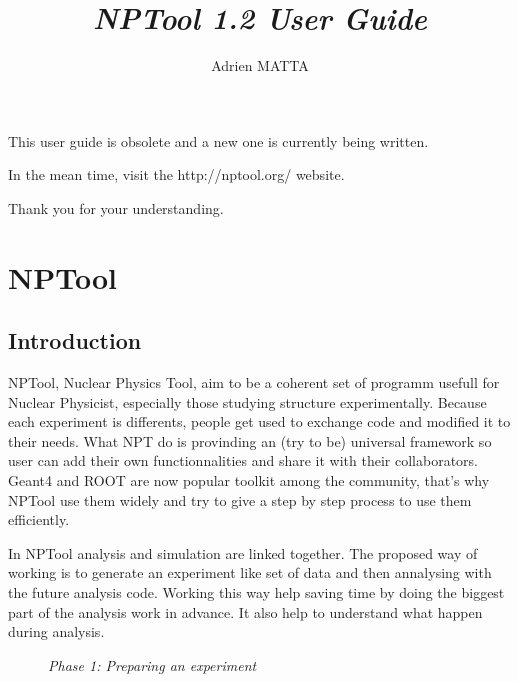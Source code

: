 \documentclass{book}
\begin{document}
\title{\emph{NPTool 1.2 User Guide}}
\author{Adrien MATTA}
\maketitle 

\clearpage
\vspace*{\fill}
\begin{center}
\begin{minipage}{.6\textwidth}
\large This user guide is obsolete and a new one is currently being written.

\large In the mean time, visit the http://nptool.org/ website. 

\large Thank you for your understanding.
\end{minipage}
\end{center}
\vfill %
\clearpage


\pagebreak
\tableofcontents %
\pagebreak

\chapter[NPTool]{NPTool}
\section {Introduction}

NPTool, Nuclear Physics Tool, aim to be a coherent set of programm usefull for Nuclear Physicist, especially those studying structure experimentally. 
Because each experiment is differents, people get used to exchange code and modified it to their needs. 
What NPT do is provinding an (try to be) universal framework so user can add their own functionnalities and share it with their collaborators. 
Geant4 and ROOT are now popular toolkit among the community, that's why NPTool use them widely and try to give a step by step process to use them efficiently.

In NPTool analysis and simulation are linked together. 
The proposed way of working is to generate an experiment like set of data and then annalysing with the future analysis code. 
Working this way help saving time by doing the biggest part of the analysis work in advance. 
It also help to understand what happen during analysis. 

				\begin{figure}[!htbp]
					\centering
					\caption{ \emph{Phase 1: Preparing an experiment} }
				\end{figure}
\end{document}
